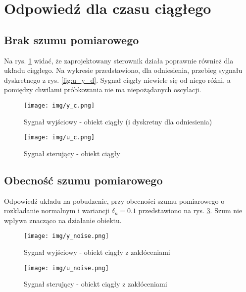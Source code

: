 \documentclass[fleqn]{article}
\begin{document}
\section{Odpowiedź dla czasu ciągłego}

\subsection{Brak szumu pomiarowego}

Na rys. \ref{fig:y_c} widać, że zaprojektowany sterownik działa poprawnie również dla układu ciągłego. Na wykresie przedstawiono, dla odniesienia, przebieg sygnału dyskretnego z rys. \ref{fig:u_y_d}. Sygnał ciągły niewiele się od niego różni, a pomiędzy chwilami próbkowania nie ma niepożądanych oscylacji. 


\begin{figure}[H]
    \centering
    \texttt{[image: img/y\_c.png]}
    \caption{Sygnał wyjściowy - obiekt ciągły (i dyskretny dla odniesienia)}
    \label{fig:y_c}
\end{figure}

\begin{figure}[H]
    \centering
    \texttt{[image: img/u\_c.png]}
    \caption{Sygnał sterujący - obiekt ciągły}
    \label{fig:u_c}
\end{figure}


\subsection{Obecność szumu pomiarowego}
Odpowiedź układu na pobudzenie, przy obecności szumu pomiarowego o rozkładanie normalnym i wariancji $\delta_n=0.1$ przedstawiono na rys. \ref{fig:y_noise}. Szum nie wpływa znacząco na działanie obiektu.
\begin{figure}[H]
    \centering
    \texttt{[image: img/y\_noise.png]}
    \caption{Sygnał wyjściowy - obiekt ciągły z zakłóceniami}
    \label{fig:y_noise}
\end{figure}


\begin{figure}[H]
    \centering
    \texttt{[image: img/u\_noise.png]}
    \caption{Sygnał sterujący - obiekt ciągły z zakłóceniami}
    \label{fig:u_noise}
\end{figure}
\end{document}

